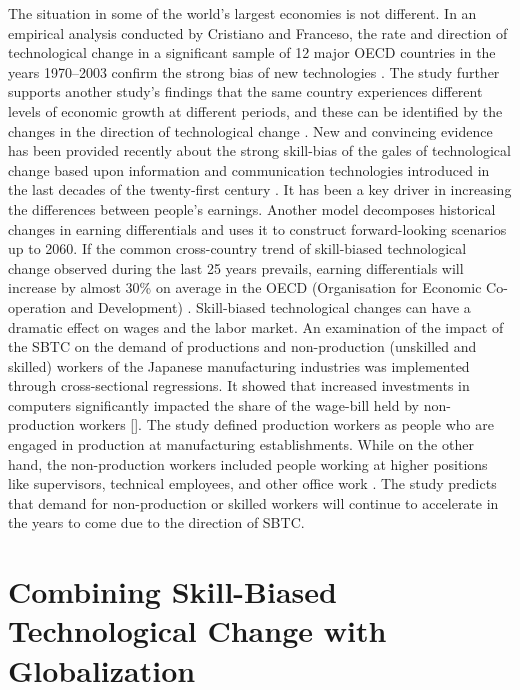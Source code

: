 The situation in some of the world's largest economies is not different. In an empirical analysis conducted by Cristiano and Franceso, the rate and direction of technological change in a significant sample of 12 major OECD countries in the years 1970–2003 confirm the strong bias of new technologies \cite{antonelli2010effects}. The study further supports another study's findings that the same country experiences different levels of economic growth at different periods, and these can be identified by the changes in the direction of technological change \cite{david2005tale}. New and convincing evidence has been provided recently about the strong skill-bias of the gales of technological change based upon information and communication technologies introduced in the last decades of the twenty-first century \cite{goldin2009race}. It has been a key driver in increasing the differences between people's earnings. Another model decomposes historical changes in earning differentials and uses it to construct forward-looking scenarios up to 2060. If the common cross-country trend of skill-biased technological change observed during the last 25 years prevails, earning differentials will increase by almost 30\% on average in the OECD (Organisation for Economic Co-operation and Development) \cite{braconier_ruiz-valenzuela_2014}. Skill-biased technological changes can have a dramatic effect on wages and the labor market. An examination of the impact of the SBTC on the demand of productions and non-production (unskilled and skilled) workers of the Japanese manufacturing industries was implemented through cross-sectional regressions. It showed that increased investments in computers significantly impacted the share of the wage-bill held by non-production workers []. The study defined production workers as people who are engaged in production at manufacturing establishments. While on the other hand, the non-production workers included people working at higher positions like supervisors, technical employees, and other office work \cite{sakurai2001biased}. The study predicts that demand for non-production or skilled workers will continue to accelerate in the years to come due to the direction of SBTC.

\section{Combining Skill-Biased Technological Change with Globalization}

